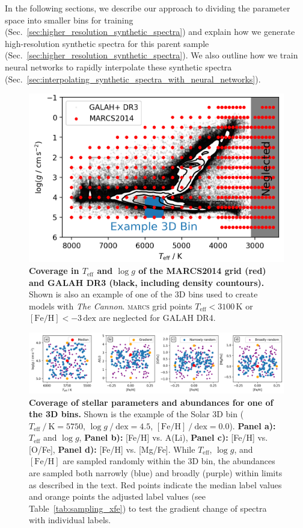 \documentclass[
  journal=pasa,
  manuscript=research-paper, %
  year=2024,
  volume=37
]{cup-journal}
\newcommand{\Teff}{$T_\mathrm{eff}$\xspace}
\newcommand{\logg}{$\log g$\xspace}
\newcommand{\feh}{$\mathrm{[Fe/H]}$\xspace}
\newcommand{\TheCannon}{\textit{The Cannon}\xspace}
\newcommand{\marcs}{\textsc{marcs}\xspace}
\newcommand{\dex}{\,\mathrm{dex}}	%
\newcommand{\K}{\,\mathrm{K}}	%
\begin{document}
In the following sections, we describe our approach to dividing the parameter space into smaller bins for training (Sec.~\ref{sec:higher_resolution_synthetic_spectra}) and explain how we generate high-resolution synthetic spectra for this parent sample (Sec.~\ref{sec:higher_resolution_synthetic_spectra}). We also outline how we train neural networks to rapidly interpolate these synthetic spectra (Sec.~\ref{sec:interpolating_synthetic_spectra_with_neural_networks}).

\begin{figure}[ht]
 \centering
 \includegraphics[width=\textwidth]{figures/teff_logg_grid_coverage.png}
 \caption{\textbf{Coverage in \Teff and \logg of the MARCS2014 grid (red) and GALAH DR3 (black, including density countours).} Shown is also an example of one of the 3D bins used to create models with \TheCannon. \marcs grid points \Teff$ < 3100\K$ or \feh$<-3\dex$ are neglected for GALAH DR4.}
 \label{fig:teff_logg_grid_coverage}
\end{figure}

\begin{figure}[ht]
 \centering
 \includegraphics[width=\textwidth]{figures/example_3d_bin_sample.png}
 \caption{\textbf{Coverage of stellar parameters and abundances for one of the 3D bins.} Shown is the example of the Solar 3D bin ($T_\mathrm{eff}~/~\mathrm{K} = 5750$, $\log g~/~\mathrm{dex} = 4.5$, $\mathrm{[Fe/H]}~/~\mathrm{dex} = 0.0$). \textbf{Panel a):} \Teff and \logg, \textbf{Panel b):} [Fe/H] vs. A(Li), \textbf{Panel c):} [Fe/H] vs. [O/Fe], \textbf{Panel d):} [Fe/H] vs. [Mg/Fe]. While \Teff, \logg, and \feh are sampled randomly within the 3D bin, the abundances are sampled both narrowly (blue) and broadly (purple) within limits as described in the text. Red points indicate the median label values and orange points the adjusted label values (see Table~\ref{tab:sampling_xfe}) to test the gradient change of spectra with individual labels.}
 \label{fig:example_3d_bin_sample}
\end{figure}
\end{document}
